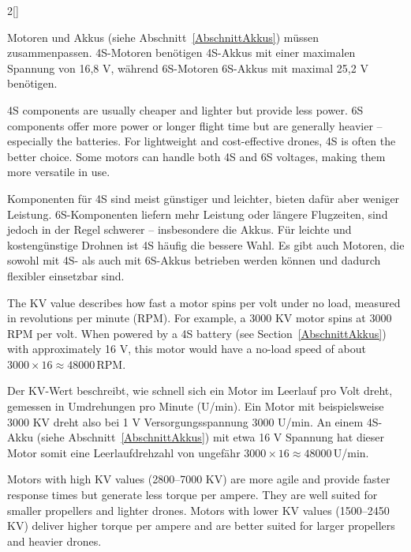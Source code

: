 \begin{paracol}{2}[]
\colger

Motoren und Akkus (siehe Abschnitt~\ref{AbschnittAkkus}) müssen zusammenpassen. 4S-Motoren benötigen 4S-Akkus mit einer maximalen Spannung von 16,8 V, während 6S-Motoren 6S-Akkus mit maximal 25,2 V benötigen.

\coleng

4S components are usually cheaper and lighter but provide less power. 6S components offer more power or longer flight time but are generally heavier -- especially the batteries. For lightweight and cost-effective drones, 4S is often the better choice. Some motors can handle both 4S and 6S voltages, making them more versatile in use.

\colger

Komponenten für 4S sind meist günstiger und leichter, bieten dafür aber weniger Leistung. 6S-Komponenten liefern mehr Leistung oder längere Flugzeiten, sind jedoch in der Regel schwerer -- insbesondere die Akkus. Für leichte und kostengünstige Drohnen ist 4S häufig die bessere Wahl. Es gibt auch Motoren, die sowohl mit 4S- als auch mit 6S-Akkus betrieben werden können und dadurch flexibler einsetzbar sind.

\colende

\renewcommand{\deutschertitel}{KV-Wert}
\renewcommand{\englischertitel}{KV Value}
\makrounterabschnitt
\label{AbschnittMotorenKV}

The KV value describes how fast a motor spins per volt under no load, measured in revolutions per minute (RPM). For example, a 3000 KV motor spins at 3000 RPM per volt. When powered by a 4S battery (see Section~\ref{AbschnittAkkus}) with approximately 16 V, this motor would have a no-load speed of about \(3000 \times 16 \approx 48000\)\,RPM.

\colger

Der KV-Wert beschreibt, wie schnell sich ein Motor im Leerlauf pro Volt dreht, gemessen in Umdrehungen pro Minute (U/min). Ein Motor mit beispielsweise 3000 KV dreht also bei 1 V Versorgungsspannung 3000 U/min. An einem 4S-Akku (siehe Abschnitt~\ref{AbschnittAkkus}) mit etwa 16 V Spannung hat dieser Motor somit eine Leerlaufdrehzahl von ungefähr \(3000 \times 16 \approx 48000\)\,U/min.

\coleng

Motors with high KV values (2800--7000 KV) are more agile and provide faster response times but generate less torque per ampere. They are well suited for smaller propellers and lighter drones. Motors with lower KV values (1500--2450 KV) deliver higher torque per ampere and are better suited for larger propellers and heavier drones.


\end{paracol}
